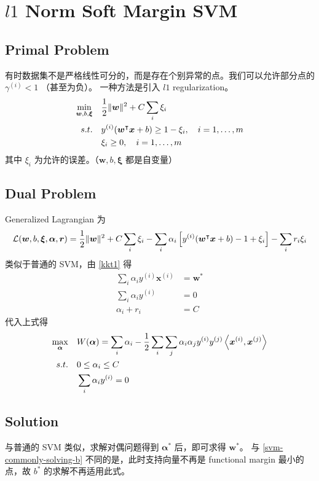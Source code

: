 \section{$ l1 $ Norm Soft Margin SVM}
	\subsection{Primal Problem}
		有时数据集不是严格线性可分的，而是存在个别异常的点。我们可以允许部分点的 $ \gamma^{(i)} < 1 $ （甚至为负）。
		一种方法是引入 $ l1 $ regularization。
		\begin{align*}
			\min_{\bm{w}, b, \bm{\xi}} \quad & \frac{1}{2} \| \bm{w} \|^2 + C \sum_i \xi_i \\
			s.t. \quad & y^{(i)} (\bm{w^}\intercal \bm{x} + b) \geq 1 - \xi_i, \quad i = 1, \ldots, m \\
			& \xi_i \geq 0, \quad i = 1, \ldots, m
		\end{align*}
		其中 $ \xi_i $ 为允许的误差。（$ \bm{w}, b, \bm{\xi} $ 都是自变量）
		
	\subsection{Dual Problem}
		Generalized Lagrangian 为
		\begin{equation*}
			\mathcal{L}( \bm{w}, b, \bm{\xi}, \bm{\alpha}, \bm{r} ) = \frac{1}{2} \| \bm{w} \|^2 + C \sum_i \xi_i - \sum_i \alpha_i \left[ y^{(i)} (\bm{w^}\intercal \bm{x} + b) - 1 + \xi_i \right] - \sum_i r_i \xi_i
		\end{equation*}
		类似于普通的 SVM，由 \eqref{kkt1} 得
		\begin{align}
			\sum_i \alpha_i y^{(i)} \bm{x}^{(i)} &= \bm{w}^* \label{eq:soft-margin-kkt1}\\
			\sum_i \alpha_i y^{(i)} &= 0 \label{eq:soft-margin-kkt2}\\
			\alpha_i + r_i &= C
		\end{align}
		代入上式得
		\begin{align}
			\max_{\bm{\alpha}} \quad & W(\bm{\alpha}) = \sum_i \alpha_i - \frac{1}{2} \sum_i \sum_j \alpha_i \alpha_j y^{(i)} y^{(j)} \left\langle \bm{x}^{(i)} , \bm{x}^{(j)} \right\rangle \label{eq:soft-margin-obj-function}\\
			s.t. \quad & 0 \leq \alpha_i \leq C \\
			& \sum_i \alpha_i y^{(i)} = 0
		\end{align}
		
	\subsection{Solution}
		与普通的 SVM 类似，求解对偶问题得到 $ \bm{\alpha}^* $ 后，即可求得 $ \bm{w}^* $。
		与 \eqref{svm-commonly-solving-b} 不同的是，此时支持向量不再是 functional margin 最小的点，故 $ b^* $ 的求解不再适用此式。
		
